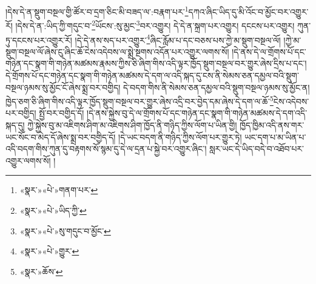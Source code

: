 །དེས་དེ་ན་སྡུག་བསྔལ་གྱི་ཚོར་བ་དྲག་ཅིང་མི་བཟད་ལ་:བརྣག་པར་\footnote{«སྣར་»«པེ་»གནག་པར་}དཀའ་ཞིང་ཡིད་དུ་མི་འོང་བ་མྱོང་བར་འགྱུར་རོ། །དེས་དེ་ན་:ཡིད་ཀྱི་གདུང་བ་\footnote{«སྣར་»«པེ་»ཡིད་ཀྱི་}ཡོངས་:སུ་མྱང་\footnote{«སྣར་»«པེ་»སུ་གདུང་བ་མྱོང་}བར་འགྱུར། དེ་དེ་ན་སྐྲག་པར་འགྱུར། དངངས་པར་འགྱུར། ཀུན་ཏུ་དངངས་པར་འགྱུར་རོ། །དེ་དེ་ནས་སད་པར་འགྱུར་\footnote{«སྣར་»«པེ་»གྱུར་}ཞིང་རློམ་པ་དང་བཅས་པས་ཀྱེ་མ་སྡུག་བསྔལ་ལོ། །ཀྱེ་མ་སྡུག་བསྔལ་ལོ་ཞེས་ངུ་ཞིང་ཆོ་ངེས་འདེབས་ལ་སྨྲེ་སྔགས་འདོན་པར་འགྱུར་ལགས་སོ། །དེ་ནས་དེ་ལ་གྲོགས་པོ་དང་གཉེན་དང་སྣག་གི་གཉེན་མཚམས་རྣམས་ཀྱིས་ཅི་ཞིག་གིས་འདི་ལྟར་ཁྱོད་སྡུག་བསྔལ་བར་གྱུར་ཞེས་དྲིས་པ་དང་། དེ་གྲོགས་པོ་དང་གཉེན་དང་སྣག་གི་གཉེན་མཚམས་དེ་དག་ལ་འདི་སྐད་དུ་ངས་ནི་སེམས་ཅན་དམྱལ་བའི་སྡུག་བསྔལ་ཉམས་སུ་མྱོང་ངོ་ཞེས་སྨྲ་བར་བགྱིད། དེ་བདག་གིས་ནི་སེམས་ཅན་དམྱལ་བའི་སྡུག་བསྔལ་ཉམས་སུ་མྱོང་ན། ཁྱེད་ཅག་ཅི་ཞིག་གིས་འདི་ལྟར་ཁྱོད་སྡུག་བསྔལ་བར་གྱུར་ཞེས་འདྲི་བར་བྱེད་དམ་ཞེས་དེ་དག་ལ་ཆོ་\footnote{«སྣར་»ཆོས་}ངེས་འདེབས་པར་བགྱིད། སྤྱོ་བར་བགྱིད་དོ། །དེ་ནས་སྐྱེས་བུ་དེ་ལ་གྲོགས་པོ་དང་གཉེན་དང་སྣག་གི་གཉེན་མཚམས་དེ་དག་འདི་སྐད་དུ། ཀྱེ་སྐྱེས་བུ་མ་འཇིགས་ཤིག་མ་འཇིགས་ཤིག་ཁྱོད་ནི་གཉིད་ཀྱིས་ལོག་པ་ཡིན་གྱི། ཁྱོད་ཁྱིམ་འདི་ནས་གར་ཡང་སོང་བ་མེད་དོ་ཞེས་སྨྲ་བར་བགྱིད་དོ། །དེ་ཡང་བདག་ནི་གཉིད་ཀྱིས་ལོག་པར་གྱུར་ཏེ། ཡང་དག་པ་མ་ཡིན་པ་འདི་བདག་གིས་ཀུན་དུ་བརྟགས་སོ་སྙམ་དུ་དེ་ལ་དྲན་པ་སྐྱེ་བར་འགྱུར་ཞིང་། སླར་ཡང་དེ་ཡིད་བདེ་བ་འཐོབ་པར་འགྱུར་ལགས་སོ། །
